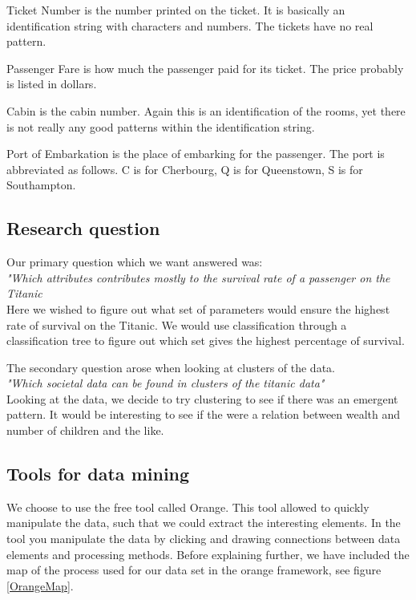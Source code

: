 \documentclass[a4paper,11pt]{article}
\begin{document}
Ticket Number is the number printed on the ticket. It is basically an identification string with characters and numbers. The tickets have no real pattern.

Passenger Fare is how much the passenger paid for its ticket. The price probably is listed in dollars.

Cabin is the cabin number. Again this is an identification of the rooms, yet there is not really any good patterns within the identification string.

Port of Embarkation is the place of embarking for the passenger. The port is abbreviated as follows. C is for Cherbourg,	Q is for Queenstown, S is for Southampton.

\subsection{Research question}
Our primary question which we want answered was:\\
\textit{"Which attributes contributes mostly to the survival rate of a passenger on the Titanic}\\
Here we wished to figure out what set of parameters would ensure the highest rate of survival on the Titanic. We would use classification through a classification tree to figure out which set gives the highest percentage of survival.

The secondary question arose when looking at clusters of the data.\\
\textit{"Which societal data can be found in clusters of the titanic data"}\\
Looking at the data, we decide to try clustering to see if there was an emergent pattern. It would be interesting to see if the were a relation between wealth and number of children and the like. 
\subsection{Tools for data mining}
We choose to use the free tool called Orange\cite{orange}. This tool allowed to quickly manipulate the data, such that we could extract the interesting elements. 
In the tool you manipulate the data by clicking and drawing connections between data elements and processing methods. Before explaining further, we have included the map of the process used for our data set in the orange framework, see figure \ref{OrangeMap}.
\end{document}
